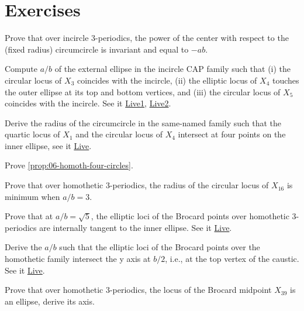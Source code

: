 \section{Exercises}

\begin{exercise}
Prove that over incircle 3-periodics, the power of the center with respect to the (fixed radius) circumcircle is invariant and  equal to $-a b$.
\end{exercise}

\begin{exercise}
Compute $a/b$ of the external ellipse in the incircle CAP family such that (i) the circular locus of $X_3$ coincides with the incircle, (ii) the elliptic locus of $X_4$ touches the outer ellipse at its top and bottom vertices, and (iii) the circular locus of $X_5$ coincides with the incircle. See it \href{https://bit.ly/3wzw1CD}{Live1}, \href{https://bit.ly/3vnVHlL}{Live2}.
\end{exercise}

\begin{exercise}
Derive the radius of the circumcircle in the same-named family such that the quartic locus of $X_1$ and the circular locus of $X_4$ intersect at four points on the inner ellipse, see it \href{https://bit.ly/3wzQkjp}{Live}. 
\end{exercise}

\begin{exercise}
Prove \cref{prop:06-homoth-four-circles}.
\end{exercise}

\begin{exercise}
Prove that over homothetic 3-periodics, the radius of the circular locus of $X_{16}$ is minimum when $a/b=3$.
\end{exercise}

\begin{exercise}
Prove that at $a/b=\sqrt{5}$, the elliptic loci of the Brocard points over homothetic 3-periodics are internally tangent to the inner ellipse.  See it \href{https://bit.ly/3fkEMuG}{Live}.
\end{exercise}

\begin{exercise}
Derive the $a/b$ such that the elliptic loci of the Brocard points over the homothetic family intersect the y axis at $b/2$, i.e., at the top vertex of the caustic. See it \href{https://bit.ly/3fm8G1u}{Live}.
\end{exercise}

\begin{exercise}
Prove that over homothetic 3-periodics, the locus of the Brocard midpoint $X_{39}$ is an ellipse, derive its axis.
\end{exercise}

